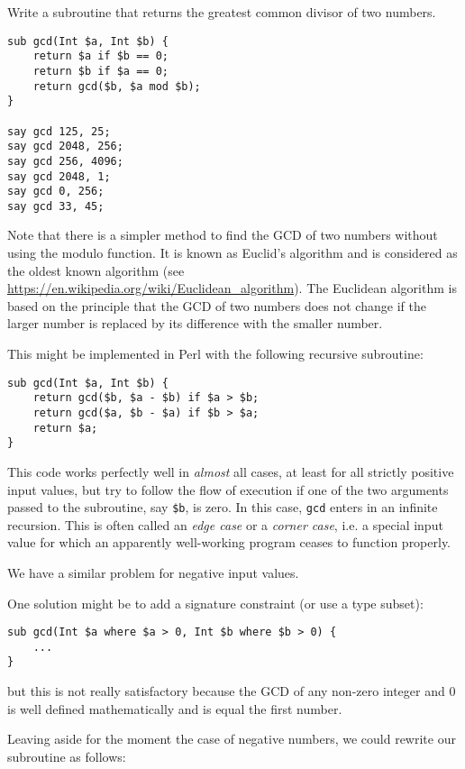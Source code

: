 Write a subroutine that returns the greatest common divisor of two numbers.

\begin{verbatim}
sub gcd(Int $a, Int $b) {
    return $a if $b == 0;
    return $b if $a == 0;
    return gcd($b, $a mod $b);
}

say gcd 125, 25;
say gcd 2048, 256;
say gcd 256, 4096;
say gcd 2048, 1;
say gcd 0, 256;
say gcd 33, 45;
\end{verbatim}

Note that there is a simpler method to find the GCD of 
two numbers without using the modulo function. It is known
as Euclid's algorithm and is considered as the oldest known 
algorithm (see \url{https://en.wikipedia.org/wiki/Euclidean_algorithm}). The Euclidean algorithm is based on 
the principle that the GCD of two numbers does not change 
if the larger number is replaced by its difference with 
the smaller number.

This might be implemented in Perl with the following recursive 
subroutine:

\begin{verbatim}
sub gcd(Int $a, Int $b) { 
    return gcd($b, $a - $b) if $a > $b;
    return gcd($a, $b - $a) if $b > $a;
    return $a;
}
\end{verbatim}
%

This code works perfectly well in \emph{almost} all cases, 
at least for all strictly positive input values, 
but try to follow the flow of execution if one of the 
two arguments passed to the subroutine, say {\tt \$b}, 
is zero. In this case, {\tt gcd} enters in an infinite 
recursion. This is often called an \emph{edge case} or a 
\emph{corner case}, i.e. a special input value for which 
an apparently well-working program ceases to function properly.

We have a similar problem for negative input values.

One solution might be to add a signature constraint (or 
use a type subset):
\begin{verbatim}
sub gcd(Int $a where $a > 0, Int $b where $b > 0) {
    ...
}
\end{verbatim}
%

but this is not really satisfactory because the GCD of any 
non-zero integer and 0 is well defined mathematically and 
is equal the first number.

Leaving aside for the moment the case of negative numbers, 
we could rewrite our subroutine as follows:

